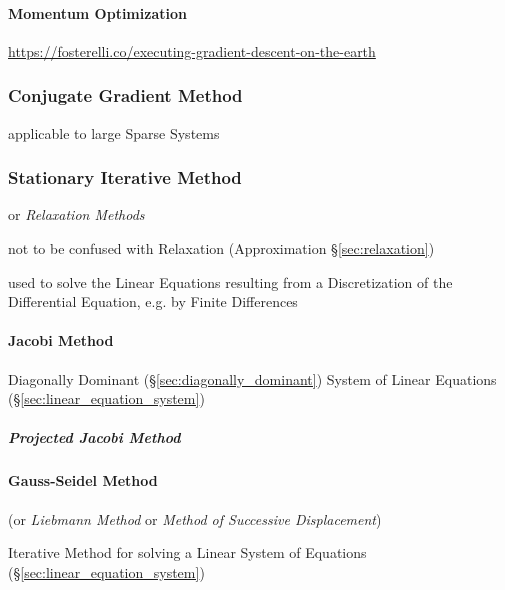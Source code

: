 \paragraph{Momentum Optimization}\label{sec:momentum_optmization}\hfill

\url{https://fosterelli.co/executing-gradient-descent-on-the-earth}



\subsubsection{Conjugate Gradient Method}\label{sec:conjugate_gradient_method}

applicable to large Sparse Systems



\subsubsection{Stationary Iterative Method}
\label{sec:stationary_iterative}

or \emph{Relaxation Methods}

\fist not to be confused with Relaxation (Approximation \S\ref{sec:relaxation})

used to solve the Linear Equations resulting from a Discretization of the
Differential Equation, e.g. by Finite Differences



\paragraph{Jacobi Method}\label{sec:jacobi_method}\hfill

Diagonally Dominant (\S\ref{sec:diagonally_dominant}) System of Linear
Equations (\S\ref{sec:linear_equation_system})



\subparagraph{Projected Jacobi Method}
\label{sec:projected_jacobi_method}



\paragraph{Gauss-Seidel Method}\label{sec:gauss_seidel}\hfill

(or \emph{Liebmann Method} or \emph{Method of Successive
  Displacement})

Iterative Method for solving a Linear System of Equations
(\S\ref{sec:linear_equation_system})

